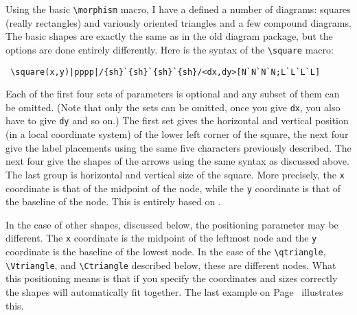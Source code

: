\documentclass[12pt]{article}
\begin{document}
{Using the basic
\verb.\morphism.  macro, I have a defined a number of
diagrams:  squares (really rectangles) and variously oriented triangles
and a few compound diagrams.  The basic shapes are exactly the same as
in the old diagram package, but the options are done entirely
differently.  Here is the syntax of the
\verb.\square.  macro:
 \begin{verbatim}
 \square(x,y)|pppp|/{sh}`{sh}`{sh}`{sh}/<dx,dy>[N`N`N`N;L`L`L`L]
 \end{verbatim}
 Each of the first four sets of parameters is optional and any subset of
them can be omitted.  (Note that only the sets can be omitted, once you
give \verb.dx., you also have to give \verb.dy. and
so on.)  The first set gives the horizontal and vertical position (in a
local coordinate system) of the lower left corner of the square, the
next four give the label placements using the same five characters
previously described.  The next four give the shapes of the arrows using
the same syntax as discussed above.  The last group is horizontal and
vertical size of the square.  More precisely, the \verb.x.
coordinate is that of the midpoint of the node, while the
\verb.y. coordinate is that of the baseline of the node.  This
is entirely based on \xypic.

In the case of other shapes, discussed below, the positioning parameter
may be different.  The \verb.x. coordinate is the midpoint of
the leftmost node and the \verb.y. coordinate is the baseline
of the lowest node.  In the case of the
\verb.\qtriangle.,
\verb.\Vtriangle., and
\verb.\Ctriangle. described below, these are different
nodes.  What this positioning means is that if you specify the
coordinates and sizes correctly the shapes will automatically fit
together.  The last example on Page~\pageref{TTTdiag} illustrates this.

}
\end{document}
